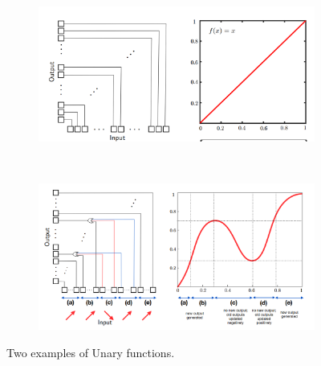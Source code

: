\documentclass[12pt]{article}
\begin{document}
\begin{figure}[h!]
	\begin{subfigure}{.5\textwidth}
		\centering
		\includegraphics[height=\linewidth]{figures/thermometer1.png}
		\caption{}
	\end{subfigure}%
	\\
	\begin{subfigure}{.5\textwidth}
		\centering
		\includegraphics[height=\linewidth]{figures/thermometer2.png}
		\caption{}
	\end{subfigure}%
	\caption{Two examples of Unary functions.}
	\label{fig:thermometer}
\end{figure}
\end{document}
